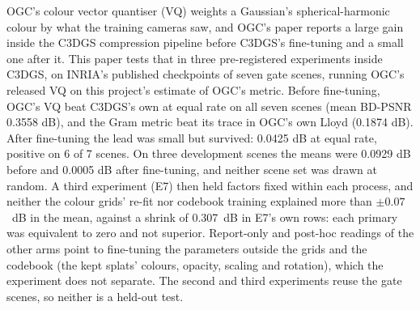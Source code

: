 OGC's colour vector quantiser (VQ) weights a Gaussian's spherical-harmonic colour by what the training cameras saw, and OGC's paper reports a large gain inside the C3DGS compression pipeline before C3DGS's fine-tuning and a small one after it. %
This paper tests that in three pre-registered experiments inside C3DGS, on INRIA's published checkpoints of seven gate scenes, running OGC's released VQ on this project's estimate of OGC's metric. %
Before fine-tuning, OGC's VQ beat C3DGS's own at equal rate on all seven scenes (mean BD-PSNR 0.3558 dB), and the Gram metric beat its trace in OGC's own Lloyd (0.1874 dB). %
After fine-tuning the lead was small but survived: 0.0425 dB at equal rate, positive on 6 of 7 scenes. %
On three development scenes the means were 0.0929 dB before and 0.0005 dB after fine-tuning, and neither scene set was drawn at random. %
A third experiment (E7) then held factors fixed within each process, and neither the colour grids' re-fit nor codebook training explained more than $\pm 0.07$~dB in the mean, against a shrink of 0.307~dB in E7's own rows: each primary was equivalent to zero and not superior. %
Report-only and post-hoc readings of the other arms point to fine-tuning the parameters outside the grids and the codebook (the kept splats' colours, opacity, scaling and rotation), which the experiment does not separate. %
The second and third experiments reuse the gate scenes, so neither is a held-out test. %
